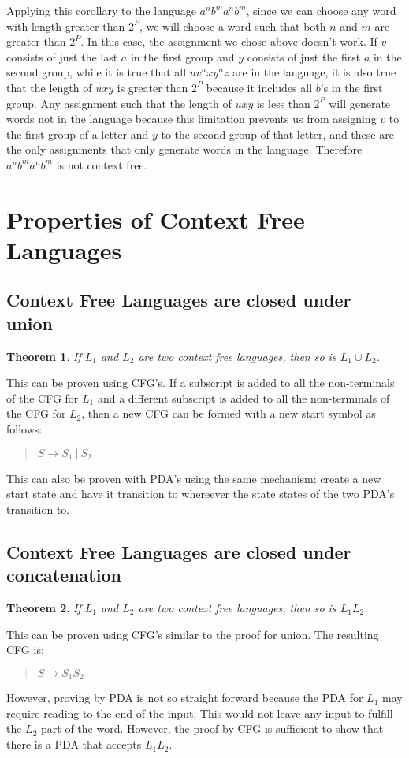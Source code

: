 \documentclass[letterpaper,12pt,openany,reqno]{book}%
\newtheorem{theorem}{Theorem}
\begin{document}
Applying this corollary to the language $a^nb^ma^nb^m$, since we can choose any word with length greater than $2^P$, we will choose a word such that both $n$ and $m$ are greater than $2^P$. In this case, the assignment we chose above doesn't work. If $v$ consists of just the last $a$ in the first group and $y$ consists of just the first $a$ in the second group, while it is true that all $uv^nxy^nz$ are in the language, it is also true that the length of $uxy$ is greater than $2^P$ because it includes all $b$'s in the first group. Any assignment such that the length of $uxy$ is less than $2^P$ will generate words not in the language because this limitation prevents us from assigning $v$ to the first group of a letter and $y$ to the second group of that letter, and these are the only assignments that only generate words in the language. Therefore $a^nb^ma^nb^m$ is not context free.

\section {Properties of Context Free Languages}
\subsection {Context Free Languages are closed under union}
\begin{theorem}
\label{TH.CLF.union}
If $L_1$ and $L_2$ are two context free languages, then so is $L_1 \cup L_2$.
\end{theorem}
This can be proven using CFG's. If a subscript is added to all the non-terminals of the CFG for $L_1$ and a different subscript is added to all the non-terminals of the CFG for $L_2$, then a new CFG can be formed with a new start symbol as follows:
\begin{quote}
$S \rightarrow S_1\ |\ S_2$
\end{quote}
This can also be proven with PDA's using the same mechanism: create a new start state and have it transition to whereever the state states of the two PDA's transition to.

\subsection {Context Free Languages are closed under concatenation}
\begin{theorem}
\label{TH.CLF.concat}
If $L_1$ and $L_2$ are two context free languages, then so is $L_1 L_2$.
\end{theorem}
This can be proven using CFG's similar to the proof for union. The resulting CFG is:
\begin{quote}
$S \rightarrow S_1 S_2$
\end{quote}
However, proving by PDA is not so straight forward because the PDA for $L_1$ may require reading to the end of the input. This would not leave any input to fulfill the $L_2$ part of the word. However, the proof by CFG is sufficient to show that there is a PDA that accepts $L_1 L_2$.
\end{document}
